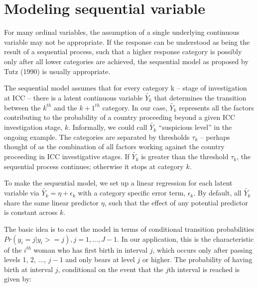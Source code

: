 
\section*{Modeling sequential variable}

For many ordinal variables, the assumption of a single underlying continuous variable may not be appropriate. If the response can be understood as being the result of a sequential process, such that a higher response category is possibly only after all lower categories are achieved, the sequential model as proposed by Tutz (1990) is usually appropriate. 

The sequential model assumes that for every category k -- stage of investigation at ICC -- there is a latent continuous variable $\tilde{Y_{k}}$ that determines the transition between the $k^{th}$ and the $k+1^{th}$ category. In our case, $\tilde{Y_{k}}$ represents all the factors contributing to the probability of a country proceeding beyond a given ICC investigation stage, $k$. Informally, we could call $\tilde{Y_{k}}$ ``suspicious level'' in the ongoing example. The categories are separated by thresholds $\tau_{k}$ -- perhaps thought of as the combination of all factors working against the country proceeding in ICC investigative stages. If $\tilde{Y_{k}}$ is greater than the threshold $\tau_{k}$, the sequential process continues; otherwise it stops at category $k$. 


To make the sequential model, we set up a linear regression for each latent variable via $\tilde{Y_{k}} = \eta + \epsilon_{k}$ with a category specific error term, $\epsilon_{k}$. By default, all $\tilde{Y_{k}}$ share the same linear predictor $\eta$, such that the effect of any potential predictor is constant across $k$. 

The basic idea is to cast the model in terms of conditional transition probabilities $Pr(y_{i} = j | y_{i} >= j), j=1, \ldots, J-1$. In our application, this is the characteristic of the $i^{th}$ woman who has first birth in interval $j$, which occurs only after passing levels 1, 2, $\ldots$, $j-1$ and only bears at level $j$ or higher. The probability of having birth at interval $j$, conditional on the event that the $j$th interval is reached is given by:

